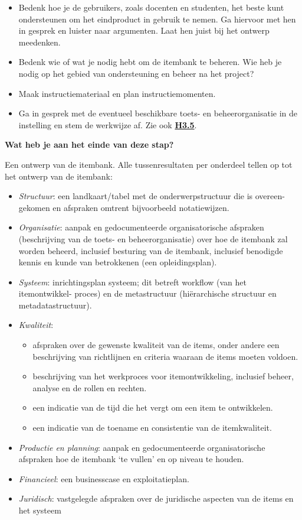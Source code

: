 \documentclass[
]{book}
\providecommand{\tightlist}{%
  \setlength{\itemsep}{0pt}\setlength{\parskip}{0pt}}
\begin{document}
\begin{itemize}
\tightlist
\item
  Bedenk hoe je de gebruikers, zoals docenten en studenten, het beste kunt ondersteunen om het eindproduct in gebruik te nemen. Ga hiervoor met hen in gesprek en luister naar argumenten. Laat hen juist bij het ontwerp meedenken.
\item
  Bedenk wie of wat je nodig hebt om de itembank te beheren. Wie heb je nodig op het gebied van ondersteuning en beheer na het project?
\item
  Maak instructiemateriaal en plan instructiemomenten.
\item
  Ga in gesprek met de eventueel beschikbare toets- en beheerorganisatie in de instelling en stem de werkwijze af. Zie ook \textbf{\protect\hyperlink{organisatie-processtappen-rollen-en-rechten}{H3.5}}.
\end{itemize}

\textbf{Wat heb je aan het einde van deze stap?}

Een ontwerp van de itembank. Alle tussenresultaten per onderdeel tellen op tot het ontwerp van de itembank:

\begin{itemize}
\tightlist
\item
  \emph{Structuur}: een landkaart/tabel met de onderwerpstructuur die is overeen- gekomen en afspraken omtrent bijvoorbeeld notatiewijzen.
\item
  \emph{Organisatie}: aanpak en gedocumenteerde organisatorische afspraken (beschrijving van de toets- en beheerorganisatie) over hoe de itembank zal worden beheerd, inclusief besturing van de itembank, inclusief benodigde kennis en kunde van betrokkenen (een opleidingsplan).
\item
  \emph{Systeem}: inrichtingsplan systeem; dit betreft workflow (van het itemontwikkel- proces) en de metastructuur (hiërarchische structuur en metadatastructuur).
\item
  \emph{Kwaliteit}:

  \begin{itemize}
  \tightlist
  \item
    afspraken over de gewenste kwaliteit van de items, onder andere een beschrijving van richtlijnen en criteria waaraan de items moeten voldoen.
  \item
    beschrijving van het werkproces voor itemontwikkeling, inclusief beheer, analyse en de rollen en rechten.
  \item
    een indicatie van de tijd die het vergt om een item te ontwikkelen.
  \item
    een indicatie van de toename en consistentie van de itemkwaliteit.
  \end{itemize}
\item
  \emph{Productie en planning}: aanpak en gedocumenteerde organisatorische afspraken hoe de itembank `te vullen' en op niveau te houden.
\item
  \emph{Financieel}: een businesscase en exploitatieplan.
\item
  \emph{Juridisch}: vastgelegde afspraken over de juridische aspecten van de items en het systeem
\end{itemize}
\end{document}
